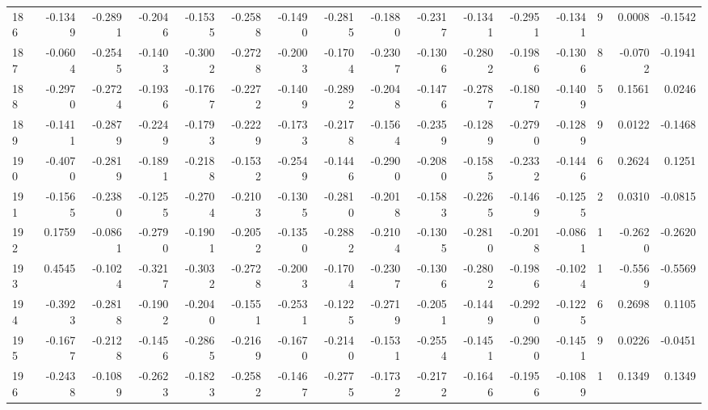 \begin{tabular}{lrrrrrrrrrrrrrrr}
186 &     -0.1349 & -0.2891 & -0.2046 & -0.1535 & -0.2588 & -0.1490 & -0.2815 & -0.1880 & -0.2317 & -0.1341 &  -0.2951 &    -0.1341 &      9 &                    0.0008 &                    -0.1542 \\
187 &     -0.0604 & -0.2545 & -0.1403 & -0.3002 & -0.2728 & -0.2003 & -0.1704 & -0.2307 & -0.1306 & -0.2802 &  -0.1986 &    -0.1306 &      8 &                   -0.0702 &                    -0.1941 \\
188 &     -0.2970 & -0.2724 & -0.1936 & -0.1767 & -0.2272 & -0.1409 & -0.2892 & -0.2048 & -0.1476 & -0.2787 &  -0.1807 &    -0.1409 &      5 &                    0.1561 &                     0.0246 \\
189 &     -0.1411 & -0.2879 & -0.2249 & -0.1793 & -0.2229 & -0.1733 & -0.2178 & -0.1564 & -0.2359 & -0.1289 &  -0.2790 &    -0.1289 &      9 &                    0.0122 &                    -0.1468 \\
190 &     -0.4070 & -0.2819 & -0.1891 & -0.2188 & -0.1532 & -0.2549 & -0.1446 & -0.2900 & -0.2080 & -0.1585 &  -0.2332 &    -0.1446 &      6 &                    0.2624 &                     0.1251 \\
191 &     -0.1565 & -0.2380 & -0.1255 & -0.2704 & -0.2103 & -0.1305 & -0.2810 & -0.2018 & -0.1583 & -0.2265 &  -0.1469 &    -0.1255 &      2 &                    0.0310 &                    -0.0815 \\
192 &      0.1759 & -0.0861 & -0.2790 & -0.1901 & -0.2052 & -0.1350 & -0.2882 & -0.2104 & -0.1305 & -0.2810 &  -0.2018 &    -0.0861 &      1 &                   -0.2620 &                    -0.2620 \\
193 &      0.4545 & -0.1024 & -0.3217 & -0.3032 & -0.2728 & -0.2003 & -0.1704 & -0.2307 & -0.1306 & -0.2802 &  -0.1986 &    -0.1024 &      1 &                   -0.5569 &                    -0.5569 \\
194 &     -0.3923 & -0.2818 & -0.1902 & -0.2040 & -0.1551 & -0.2531 & -0.1225 & -0.2719 & -0.2051 & -0.1449 &  -0.2920 &    -0.1225 &      6 &                    0.2698 &                     0.1105 \\
195 &     -0.1677 & -0.2128 & -0.1456 & -0.2865 & -0.2169 & -0.1670 & -0.2140 & -0.1531 & -0.2554 & -0.1451 &  -0.2900 &    -0.1451 &      9 &                    0.0226 &                    -0.0451 \\
196 &     -0.2438 & -0.1089 & -0.2623 & -0.1823 & -0.2582 & -0.1467 & -0.2775 & -0.1732 & -0.2172 & -0.1646 &  -0.1956 &    -0.1089 &      1 &                    0.1349 &                     0.1349 \\

\end{tabular}
